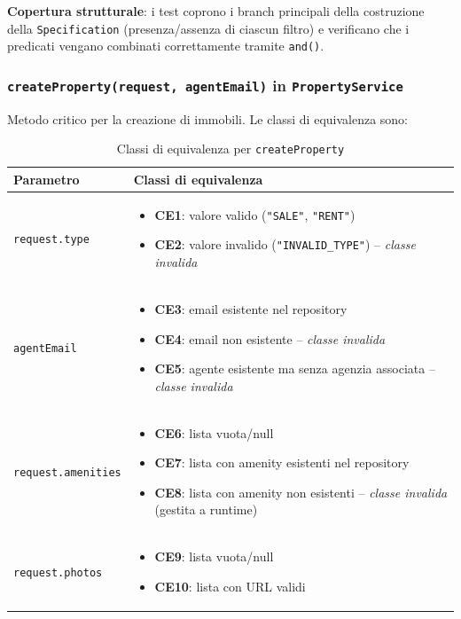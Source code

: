 \documentclass[a4paper,11pt]{report}
\begin{document}
\textbf{Copertura strutturale}: i test coprono i branch principali della costruzione della \texttt{Specification} (presenza/assenza di ciascun filtro) e verificano che i predicati vengano combinati correttamente tramite \texttt{and()}.

\subsubsection*{\texttt{createProperty(request, agentEmail)} in \texttt{PropertyService}}

Metodo critico per la creazione di immobili. Le classi di equivalenza sono:

\begin{table}[H]
\centering
\small
\renewcommand{\arraystretch}{1.3}
\begin{tabularx}{\textwidth}{|l|X|}
\toprule
\textbf{Parametro} & \textbf{Classi di equivalenza} \\
\midrule
\texttt{request.type} & 
\begin{itemize}[nosep, leftmargin=*]
  \item \textbf{CE1}: valore valido (\texttt{"SALE"}, \texttt{"RENT"})
  \item \textbf{CE2}: valore invalido (\texttt{"INVALID\_TYPE"}) -- \emph{classe invalida}
\end{itemize} \\
\midrule
\texttt{agentEmail} & 
\begin{itemize}[nosep, leftmargin=*]
  \item \textbf{CE3}: email esistente nel repository
  \item \textbf{CE4}: email non esistente -- \emph{classe invalida}
  \item \textbf{CE5}: agente esistente ma senza agenzia associata -- \emph{classe invalida}
\end{itemize} \\
\midrule
\texttt{request.amenities} & 
\begin{itemize}[nosep, leftmargin=*]
  \item \textbf{CE6}: lista vuota/null
  \item \textbf{CE7}: lista con amenity esistenti nel repository
  \item \textbf{CE8}: lista con amenity non esistenti -- \emph{classe invalida} (gestita a runtime)
\end{itemize} \\
\midrule
\texttt{request.photos} & 
\begin{itemize}[nosep, leftmargin=*]
  \item \textbf{CE9}: lista vuota/null
  \item \textbf{CE10}: lista con URL validi
\end{itemize} \\
\bottomrule
\end{tabularx}
\caption{Classi di equivalenza per \texttt{createProperty}}
\end{table}
\end{document}
